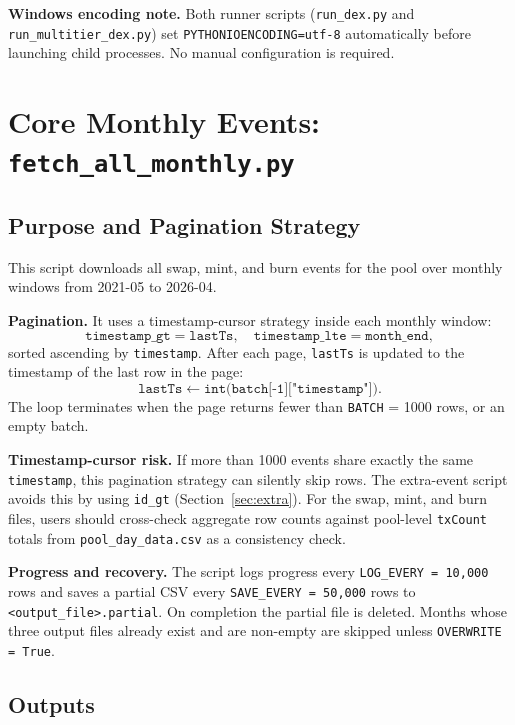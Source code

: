 \documentclass[11pt,a4paper]{article}
\begin{document}
\noindent\textbf{Windows encoding note.} Both runner scripts
(\texttt{run\_dex.py} and \texttt{run\_multitier\_dex.py}) set
\texttt{PYTHONIOENCODING=utf-8} automatically before launching child
processes. No manual configuration is required.

\section{Core Monthly Events: \texttt{fetch\_all\_monthly.py}}
\label{sec:core}

\subsection{Purpose and Pagination Strategy}

This script downloads all swap, mint, and burn events for the pool over
monthly windows from 2021-05 to 2026-04.

\noindent\textbf{Pagination.} It uses a timestamp-cursor strategy inside
each monthly window:
\[
  \texttt{timestamp\_gt} = \texttt{lastTs}, \quad
  \texttt{timestamp\_lte} = \texttt{month\_end},
\]
sorted ascending by \texttt{timestamp}. After each page, \texttt{lastTs}
is updated to the timestamp of the last row in the page:
\[
  \texttt{lastTs} \leftarrow \texttt{int(batch[-1]["timestamp"])}.
\]
The loop terminates when the page returns fewer than \texttt{BATCH} = 1000
rows, or an empty batch.

\noindent\textbf{Timestamp-cursor risk.} If more than 1000 events share
exactly the same \texttt{timestamp}, this pagination strategy can silently
skip rows. The extra-event script avoids this by using \texttt{id\_gt}
(Section~\ref{sec:extra}). For the swap, mint, and burn files, users should
cross-check aggregate row counts against pool-level \texttt{txCount} totals
from \texttt{pool\_day\_data.csv} as a consistency check.

\noindent\textbf{Progress and recovery.} The script logs progress every
\texttt{LOG\_EVERY = 10{,}000} rows and saves a partial CSV every
\texttt{SAVE\_EVERY = 50{,}000} rows to
\texttt{<output\_file>.partial}. On completion the partial file is deleted.
Months whose three output files already exist and are non-empty are skipped
unless \texttt{OVERWRITE = True}.

\subsection{Outputs}
\end{document}
